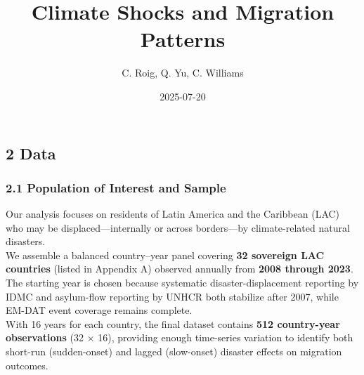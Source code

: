 \documentclass[
  11pt,
]{article}
\title{Climate Shocks and Migration Patterns}
\author{C. Roig, Q. Yu, C. Williams}
\date{2025-07-20}
\begin{document}
\maketitle

{
\setcounter{tocdepth}{2}
\tableofcontents
}
\subsection{2 Data}\label{data}

\subsubsection{2.1 Population of Interest and
Sample}\label{population-of-interest-and-sample}

Our analysis focuses on residents of Latin America and the Caribbean
(LAC) who may be displaced---internally or across borders---by
climate-related natural disasters.\\
We assemble a balanced country--year panel covering \textbf{32 sovereign
LAC countries} (listed in Appendix A) observed annually from
\textbf{2008 through 2023}. The starting year is chosen because
systematic disaster-displacement reporting by IDMC and asylum-flow
reporting by UNHCR both stabilize after 2007, while EM-DAT event
coverage remains complete.\\
With 16 years for each country, the final dataset contains \textbf{512
country-year observations} (32 × 16), providing enough time-series
variation to identify both short-run (sudden-onset) and lagged
(slow-onset) disaster effects on migration outcomes.
\end{document}
